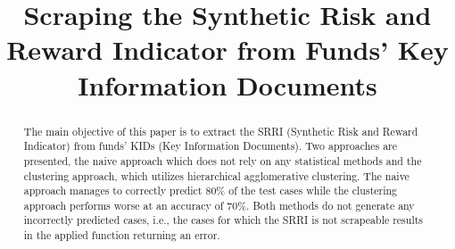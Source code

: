 \documentclass[aodsor,preprint]{imsart}
\numberwithin{equation}{section}
\theoremstyle{plain}
\begin{document}
\begin{frontmatter}
\title{Scraping the Synthetic Risk and Reward Indicator from Funds' Key Information Documents}

\begin{aug}
\author{ \snm{}}





\end{aug}

\begin{abstract}
The main objective of this paper is to extract the SRRI (Synthetic Risk and Reward Indicator) from funds' KIDs (Key Information Documents). Two approaches are presented, the naive approach which does not rely on any statistical methods and the clustering approach, which utilizes hierarchical agglomerative clustering. The naive approach manages to correctly predict 80\% of the test cases while the clustering approach performs worse at an accuracy of 70\%. Both methods do not generate any incorrectly predicted cases, i.e., the cases for which the SRRI is not scrapeable results in the applied function returning an error. 
\end{abstract}

\begin{keyword}[class=MSC]
\end{keyword}

\begin{keyword}
\kwd{\LaTeXe}
\end{keyword}

\end{frontmatter}
\end{document}
